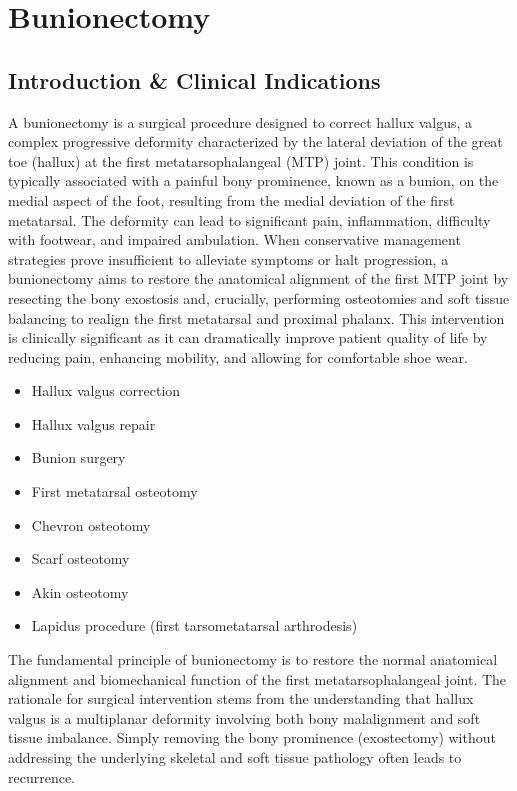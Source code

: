 \chapter{Bunionectomy}

\section*{Introduction \& Clinical Indications}
A bunionectomy is a surgical procedure designed to correct hallux valgus, a complex progressive deformity characterized by the lateral deviation of the great toe (hallux) at the first metatarsophalangeal (MTP) joint. This condition is typically associated with a painful bony prominence, known as a bunion, on the medial aspect of the foot, resulting from the medial deviation of the first metatarsal. The deformity can lead to significant pain, inflammation, difficulty with footwear, and impaired ambulation. When conservative management strategies prove insufficient to alleviate symptoms or halt progression, a bunionectomy aims to restore the anatomical alignment of the first MTP joint by resecting the bony exostosis and, crucially, performing osteotomies and soft tissue balancing to realign the first metatarsal and proximal phalanx. This intervention is clinically significant as it can dramatically improve patient quality of life by reducing pain, enhancing mobility, and allowing for comfortable shoe wear.

\begin{itemize}
  \item Hallux valgus correction
  \item Hallux valgus repair
  \item Bunion surgery
  \item First metatarsal osteotomy
  \item Chevron osteotomy
  \item Scarf osteotomy
  \item Akin osteotomy
  \item Lapidus procedure (first tarsometatarsal arthrodesis)
\end{itemize}

The fundamental principle of bunionectomy is to restore the normal anatomical alignment and biomechanical function of the first metatarsophalangeal joint. The rationale for surgical intervention stems from the understanding that hallux valgus is a multiplanar deformity involving both bony malalignment and soft tissue imbalance. Simply removing the bony prominence (exostectomy) without addressing the underlying skeletal and soft tissue pathology often leads to recurrence.

